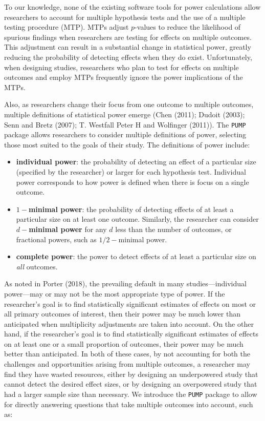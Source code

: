 \documentclass[
]{article}
\providecommand{\tightlist}{%
  \setlength{\itemsep}{0pt}\setlength{\parskip}{0pt}}
\begin{document}
To our knowledge, none of the existing software tools for power
calculations allow researchers to account for multiple hypothesis tests
and the use of a multiple testing procedure (MTP). MTPs adjust
\(p\)-values to reduce the likelihood of spurious findings when
researchers are testing for effects on multiple outcomes. This
adjustment can result in a substantial change in statistical power,
greatly reducing the probability of detecting effects when they do
exist. Unfortunately, when designing studies, researchers who plan to
test for effects on multiple outcomes and employ MTPs frequently ignore
the power implications of the MTPs.

Also, as researchers change their focus from one outcome to multiple
outcomes, multiple definitions of statistical power emerge (Chen (2011);
Dudoit (2003); Senn and Bretz (2007); T. Westfall Peter H and Wolfinger
(2011)). The \texttt{PUMP} package allows researchers to consider
multiple definitions of power, selecting those most suited to the goals
of their study. The definitions of power include:

\begin{itemize}
\tightlist
\item
  \textbf{individual power}: the probability of detecting an effect of a
  particular size (specified by the researcher) or larger for each
  hypothesis test. Individual power corresponds to how power is defined
  when there is focus on a single outcome.
\item
  \textbf{\(1-\)minimal power}: the probability of detecting effects of
  at least a particular size on at least one outcome. Similarly, the
  researcher can consider \textbf{\(d-\)minimal power} for any \(d\)
  less than the number of outcomes, or fractional powers, such as
  \(1/2-\)minimal power.
\item
  \textbf{complete power}: the power to detect effects of at least a
  particular size on \emph{all} outcomes.
\end{itemize}

As noted in Porter (2018), the prevailing default in many
studies---individual power---may or may not be the most appropriate type
of power. If the researcher's goal is to find statistically significant
estimates of effects on most or all primary outcomes of interest, then
their power may be much lower than anticipated when multiplicity
adjustments are taken into account. On the other hand, if the
researcher's goal is to find statistically significant estimates of
effects on at least one or a small proportion of outcomes, their power
may be much better than anticipated. In both of these cases, by not
accounting for both the challenges and opportunities arising from
multiple outcomes, a researcher may find they have wasted resources,
either by designing an underpowered study that cannot detect the desired
effect sizes, or by designing an overpowered study that had a larger
sample size than necessary. We introduce the \texttt{PUMP} package to
allow for directly answering questions that take multiple outcomes into
account, such as:
\end{document}

